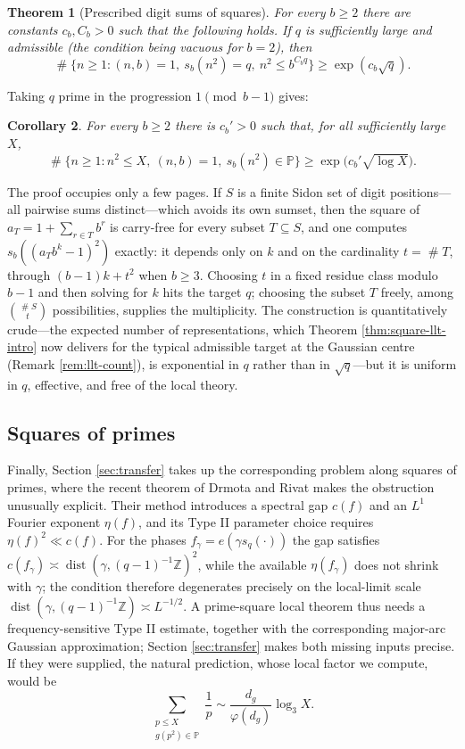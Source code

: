 \documentclass[11pt,reqno]{amsart}
\theoremstyle{plain}
\newtheorem{theorem}{Theorem}[section]
\newtheorem{corollary}[theorem]{Corollary}
\theoremstyle{definition}
\newcommand{\Z}{\mathbb{Z}}
\newcommand{\Pp}{\mathbb{P}}
\newcommand{\ee}[1]{e\!\left(#1\right)}
\newcommand{\1}{\mathbf 1}
\DeclareMathOperator{\Card}{\#}
\DeclareMathOperator{\dist}{dist}
\begin{document}
\begin{theorem}[Prescribed digit sums of squares]\label{thm:prescribed-squares}
For every $b\ge2$ there are constants $c_b,C_b>0$ such that the following holds.  If $q$ is sufficiently large and admissible (the condition being vacuous for $b=2$), then
\[
 \Card\{n\ge1:(n,b)=1,\ s_b(n^2)=q,\ n^2\le b^{C_bq}\}
 \ge \exp(c_b\sqrt q).
\]
\end{theorem}

Taking $q$ prime in the progression $1\pmod{b-1}$ gives:

\begin{corollary}\label{thm:squares-intro}
For every $b\ge2$ there is $c_b'>0$ such that, for all sufficiently large $X$,
\[
 \Card\{n\ge1:n^2\le X,\ (n,b)=1,\ s_b(n^2)\in\Pp\}
 \ge \exp\bigl(c_b'\sqrt{\log X}\bigr).
\]
\end{corollary}

The proof occupies only a few pages. If $S$ is a finite Sidon set of digit positions---all pairwise sums distinct---which avoids its own sumset, then the square of $a_T=1+\sum_{r\in T}b^r$ is carry-free for every subset $T\subseteq S$, and one computes $s_b((a_Tb^k-1)^2)$ exactly: it depends only on $k$ and on the cardinality $t=\Card T$, through $(b-1)k+t^2$ when $b\ge3$. Choosing $t$ in a fixed residue class modulo $b-1$ and then solving for $k$ hits the target $q$; choosing the subset $T$ freely, among $\binom{\Card S}{t}$ possibilities, supplies the multiplicity. The construction is quantitatively crude---the expected number of representations, which Theorem \ref{thm:square-llt-intro} now delivers for the typical admissible target at the Gaussian centre (Remark \ref{rem:llt-count}), is exponential in $q$ rather than in $\sqrt q$---but it is uniform in $q$, effective, and free of the local theory.

\subsection{Squares of primes}
Finally, Section \ref{sec:transfer} takes up the corresponding problem along squares of primes, where the recent theorem of Drmota and Rivat \cite{dr-primesquares} makes the obstruction unusually explicit. Their method introduces a spectral gap $c(f)$ and an $L^1$ Fourier exponent $\eta(f)$, and its Type II parameter choice requires $\eta(f)^2\ll c(f)$. For the phases $f_\gamma=\ee{\gamma s_q(\cdot)}$ the gap satisfies $c(f_\gamma)\asymp\dist(\gamma,(q-1)^{-1}\Z)^2$, while the available $\eta(f_\gamma)$ does not shrink with $\gamma$; the condition therefore degenerates precisely on the local-limit scale $\dist(\gamma,(q-1)^{-1}\Z)\asymp L^{-1/2}$. A prime-square local theorem thus needs a frequency-sensitive Type II estimate, together with the corresponding major-arc Gaussian approximation; Section \ref{sec:transfer} makes both missing inputs precise. If they were supplied, the natural prediction, whose local factor we compute, would be
\[
 \sum_{\substack{p\le X\\g(p^2)\in\Pp}}\frac1p
 \sim\frac{d_g}{\varphi(d_g)}\log_3X.
\]
\end{document}
